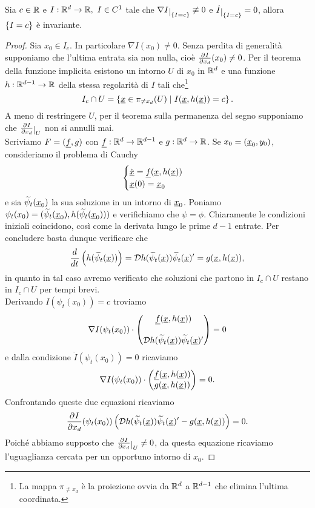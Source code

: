 \begin{proposition}\label{CostruzioneInsiemiInvariantiCurveDiLivello}
Sia $c\in\mathbb{R}$ e $I:\mathbb{R}^d\to \mathbb{R},\ I\in C^1$ tale che $\nabla I\res{\cpa{I=c}}\not\equiv 0$ e $\dot I\res{\cpa{I=c}}=0$, allora $\left\{{I=c}\right\}$ \`e invariante.
\end{proposition}
\begin{proof}
Sia $x_0\in I_c$. In particolare $\nabla I(x_0)\neq 0$. Senza perdita di generalit\`a supponiamo che l'ultima entrata sia non nulla, cio\`e $\pp{x_d}I(x_0)\neq 0$. Per il teorema della funzione implicita esistono un intorno $U$ di $x_0$ in $\mathbb{R}^d$ e una funzione $h:\mathbb{R}^{d-1}\to \mathbb{R}$ della stessa regolarit\`a di $I$ tali che\footnote{La mappa $\pi_{\neq x_d}$ \`e la proiezione ovvia da $\mathbb{R}^d$ a $\mathbb{R}^{d-1}$ che elimina l'ultima coordinata.}
\[I_c\cap U=\left\{{{\underline{x}}\in \pi_{\neq x_d}(U)\mid I({\underline{x}}, h({\underline{x}}))=c}\right\}.\]
A meno di restringere $U$, per il teorema sulla permanenza del segno supponiamo che $\pp{x_d}I\res{U}$ non si annulli mai.\\
Scriviamo $F=({\underline{f}},g)$ con ${\underline{f}}:\mathbb{R}^d\to \mathbb{R}^{d-1}$ e $g:\mathbb{R}^d\to\mathbb{R}$. Se $x_0=({\underline{x}}_0,y_0)$, consideriamo il problema di Cauchy
\[\begin{cases}
\dot {{\underline{x}}}={\underline{f}}({\underline{x}},h({\underline{x}}))\\
{\underline{x}}(0)={\underline{x}}_0
\end{cases}\]
e sia $\widetilde{\psi}_t({\underline{x}}_0)$ la sua soluzione in un intorno di ${\underline{x}}_0$. Poniamo $\psi_t(x_0)=(\widetilde{\psi}_t({\underline{x}}_0),h(\widetilde{\psi}_t({\underline{x}}_0)))$ e verifichiamo che $\psi=\phi$. Chiaramente le condizioni iniziali coincidono, cos\`i come la derivata lungo le prime $d-1$ entrate. 
Per concludere basta dunque verificare che 
\[\dd t{}\pa{h(\wt \psi_t(\ulx))}=\Dc h(\wt\psi_t(\ulx))\wt\psi_t(\ulx)'=g(\ulx,h(\ulx)),\]
in quanto in tal caso avremo verificato che soluzioni che partono in $I_c\cap U$ restano in $I_c\cap U$ per tempi brevi.\\
Derivando $I(\psi_t(x_0))=c$ troviamo 
\[\nabla I(\psi_t(x_0))\cdot \begin{pmatrix}{\underline{f}}({\underline{x}},h({\underline{x}}))\\\\\mathcal{D} h(\widetilde{\psi}_t({\underline{x}}))\widetilde{\psi}_t({\underline{x}})'\end{pmatrix}=0\]
e dalla condizione $\dot I(\psi_t(x_0))=0$ ricaviamo
\[\nabla I(\psi_t(x_0))\cdot \begin{pmatrix}{\underline{f}}({\underline{x}},h({\underline{x}}))\\g({\underline{x}},h({\underline{x}}))\end{pmatrix}=0.\]
Confrontando queste due equazioni ricaviamo
\[\pp{x_d}I(\psi_t(x_0))\pa{\Dc h(\wt\psi_t(\ulx))\wt\psi_t(\ulx)'-g(\ulx,h(\ulx))}=0.\]
Poich\'e abbiamo supposto che $\pp{x_d}I\res{U}\neq 0$, da questa equazione ricaviamo l'uguaglianza cercata per un opportuno intorno di $x_0$.
\end{proof}

